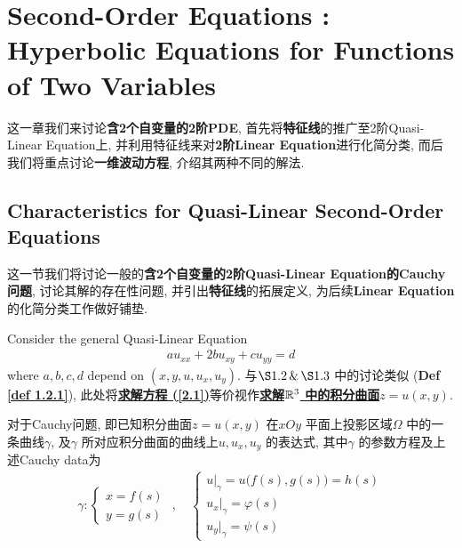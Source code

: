 \ifx\allfiles\undefined


	\else
	\fi
\chapter{Second-Order Equations : Hyperbolic Equations for Functions of Two Variables}

	这一章我们来讨论\textbf{含2个自变量的2阶PDE}, 首先将\textbf{特征线}的推广至2阶Quasi-Linear Equation上, 并利用特征线来对\textbf{2阶Linear Equation}进行化简分类, 而后我们将重点讨论\textbf{一维波动方程}, 介绍其两种不同的解法. 

\section{Characteristics for Quasi-Linear Second-Order Equations}
	这一节我们将讨论一般的\textbf{含2个自变量的2阶Quasi-Linear Equation的Cauchy问题}, 讨论其解的存在性问题, 并引出\textbf{特征线}的拓展定义, 为后续\textbf{Linear Equation} 的化简分类工作做好铺垫. 

	\vspace*{2em}

	\hspace*{-1.85em}Consider the general Quasi-Linear Equation
	\begin{align}
		au_{xx} + 2b u_{xy} + c u_{yy} = d \label{2.1}
	\end{align}
	where $a , b , c , d$ depend on $(x , y , u , u_x , u_y)$. 与$\S 1.2 \, \& \, \S 1.3$ 中的讨论类似 (\textbf{Def \ref{def 1.2.1}}), 此处将\textbf{\underline{求解方程 (\ref{2.1})}}等价视作\textbf{\underline{求解$\mathbb{R}^3$ 中的积分曲面$z = u(x , y)$}}. 

	\vspace*{1em}

	对于Cauchy问题, 即已知积分曲面$z = u(x , y)$ 在$xOy$ 平面上投影区域$\Omega$ 中的一条曲线$\gamma$, 及$\gamma$ 所对应积分曲面的曲线上$u , u_x , u_y$ 的表达式, 其中$\gamma$ 的参数方程及上述Cauchy data为
	\begin{align}
		\gamma : 
		\begin{cases}
			x = f(s) \\
			y = g(s)
		\end{cases}
		\,\, , \,\,\,\,\,\,
		\begin{cases}
			u \big|_{\gamma} = u \Big( f(s) , g(s) \Big) = h(s) \\
			u_x \big|_{\gamma} = \varphi(s) \\
			u_{y} \big|_{\gamma} = \psi(s)
		\end{cases} \label{2.2}
	\end{align}

